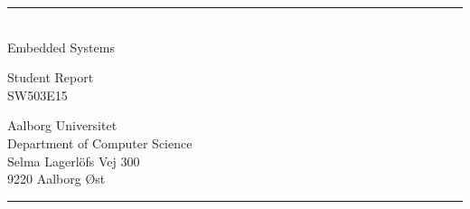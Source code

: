 \begin{titlepage}
    \addtolength{\hoffset}{0.5\evensidemargin-0.5\oddsidemargin}
    \noindent
    \vspace{1.5cm}
    \begin{center}
        \begin{spacing}{2.65} 
            \titlefont
            \TITLE
        \end{spacing}
        \vspace{-20pt}
        \textcolor{aaublue}{\rule{120pt}{2pt}}\\
        \vspace{10pt}
        {\subtitlefont
            Embedded Systems
        }
    \end{center}
    \vspace{4cm}
    \begin{center}
        \begin{spacing}{2}
            \subtitlefont
            Student Report\\
            SW503E15
        \end{spacing}
    \end{center}
    \vfill
    \noindent
\hfill
\begin{minipage}{0.5\linewidth}
    \begin{flushright}
        Aalborg Universitet\\
        Department of Computer Science\\
        Selma Lagerl{\"o}fs Vej 300\\
        9220 Aalborg {\O}st
    \end{flushright}
\end{minipage}
%
\begin{minipage}{0.02\linewidth}
    \textcolor{aaublue}{\rule{1pt}{5\baselineskip}}
\end{minipage}
    \titlepagedecoration
\end{titlepage}
\clearpage 